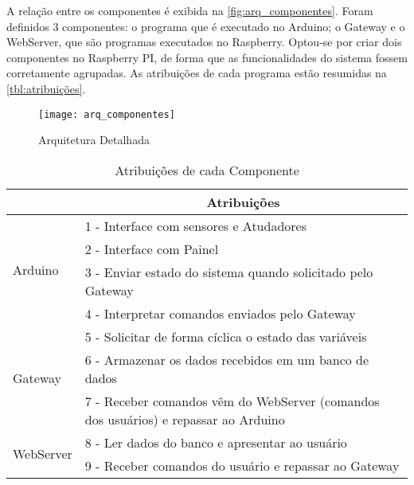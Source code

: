 			A relação entre os componentes é exibida na  \autoref{fig:arq_componentes}. Foram definidos 3 componentes: o programa que é executado no Arduino; o Gateway e o WebServer, que são programas executados no Raspberry. Optou-se por criar dois componentes no Raspberry PI, de forma que as funcionalidades do sistema fossem corretamente agrupadas. As atribuições de cada programa estão resumidas na \autoref{tbl:atribuições}.
			
			\begin{figure}[!htb]	
				\captionsetup{justification=centering}
				\begin{center}
					\texttt{[image: arq\_componentes]}  %
					\caption[Arquitetura Detalhada]{\label{fig:arq_componentes} Arquitetura Detalhada }
				\end{center}		
			\end{figure}
			
			\begin{table}[!htb]
				\centering
				\captionsetup{justification=centering}
				\caption[Atribuições de cada Componente]{Atribuições de cada Componente}
				\label{tbl:atribuições}
				\def\arraystretch{1.3}
				\begin{tabular}{m{2cm}| p{12cm}}
					& \multicolumn{1}{c}{\textbf{Atribuições}} \\ \hline
					
					\multirow{4}{*}{Arduino} 
					& 1 - Interface com sensores e Atudadores \\
					& 2 - Interface com Painel \\
					& 3 - Enviar estado do sistema quando solicitado pelo Gateway\\
					& 4 - Interpretar comandos enviados pelo Gateway \\ \hline
					
					\multirow{3}{*}{Gateway} & 5 - Solicitar de forma cíclica o estado das variáveis \\
					& 6 - Armazenar os dados recebidos em um banco de dados \\
					& 7 - Receber comandos vêm do WebServer (comandos dos usuários) e repassar ao Arduino \\ \hline
					
					\multirow{2}{*}{WebServer} & 8 - Ler dados do banco e apresentar ao usuário \\
					& 9 - Receber comandos do usuário e repassar ao Gateway \\
					
					\hline
				\end{tabular}
			\end{table}
		
